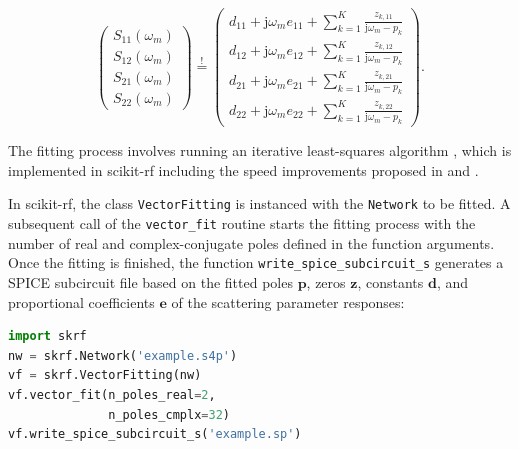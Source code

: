 \documentclass[journal, onecolumn]{IEEEtran}
\begin{document}
\begin{equation}
\begin{pmatrix}
S_{11} (\omega_m) \\
S_{12} (\omega_m) \\
S_{21} (\omega_m) \\
S_{22} (\omega_m)
\end{pmatrix} 
\overset{!}{=}
\begin{pmatrix}
d_{11} + \mathrm{j} \omega_m e_{11} + \sum _{k=1} ^{K} \frac{z_{k,11}}{\mathrm{j} \omega_m - p_k} \\
d_{12} + \mathrm{j} \omega_m e_{12} + \sum _{k=1} ^{K} \frac{z_{k,12}}{\mathrm{j} \omega_m - p_k} \\
d_{21} + \mathrm{j} \omega_m e_{21} + \sum _{k=1} ^{K} \frac{z_{k,21}}{\mathrm{j} \omega_m - p_k} \\
d_{22} + \mathrm{j} \omega_m e_{22} + \sum _{k=1} ^{K} \frac{z_{k,22}}{\mathrm{j} \omega_m - p_k}
\end{pmatrix} .
\end{equation}

The fitting process involves running an iterative least-squares algorithm \cite{vectfit}, which is implemented in scikit-rf including the speed improvements proposed in \cite{vectfit_improved} and \cite{vectfit_fast}.

In scikit-rf, the class \texttt{VectorFitting} is instanced with the \texttt{Network} to be fitted. A subsequent call of the \texttt{vector\_fit} routine starts the fitting process with the number of real and complex-conjugate poles defined in the function arguments. Once the fitting is finished, the function \texttt{write\_spice\_subcircuit\_s} generates a SPICE subcircuit file based on the fitted poles $\mathbf{p}$, zeros $\mathbf{z}$, constants $\mathbf{d}$, and proportional coefficients $\mathbf{e}$ of the scattering parameter responses:

\begin{lstlisting}[language=Python]
import skrf
nw = skrf.Network('example.s4p')
vf = skrf.VectorFitting(nw)
vf.vector_fit(n_poles_real=2, 
              n_poles_cmplx=32)
vf.write_spice_subcircuit_s('example.sp')
\end{lstlisting}
\end{document}
